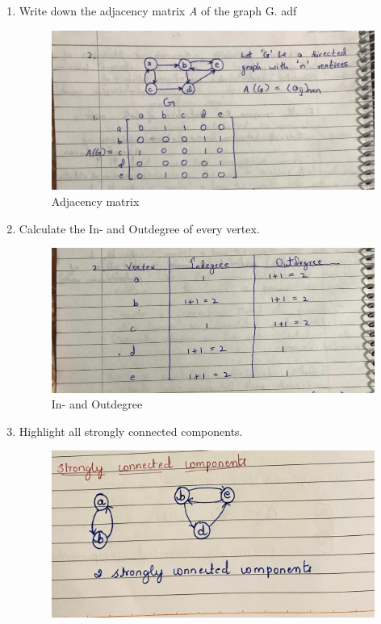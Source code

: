 \documentclass{resources/WeSTassignment}
\begin{document}
\begin{enumerate}
    \item Write down the adjacency matrix \emph{A} of the graph G. adf
    \begin{figure}[ht]
    \centering
    \includegraphics[scale=0.4]{./resources/2.1.jpeg}
    \caption{Adjacency matrix}
    \label{fig:Adjacency matrix}
\end{figure}
    \item Calculate the In- and Outdegree of every vertex.
    \begin{figure}[ht]
    \centering
    \includegraphics[scale=0.4]{./resources/2.2.jpeg}
    \caption{In- and Outdegree}
    \label{fig:In- and Outdegree}
\end{figure}
    \item Highlight all strongly connected components.
    \begin{figure}[ht]
    \centering
    \includegraphics[scale=0.4]{./resources/2.3.jpeg}

\end{figure}
\end{enumerate}
\end{document}
